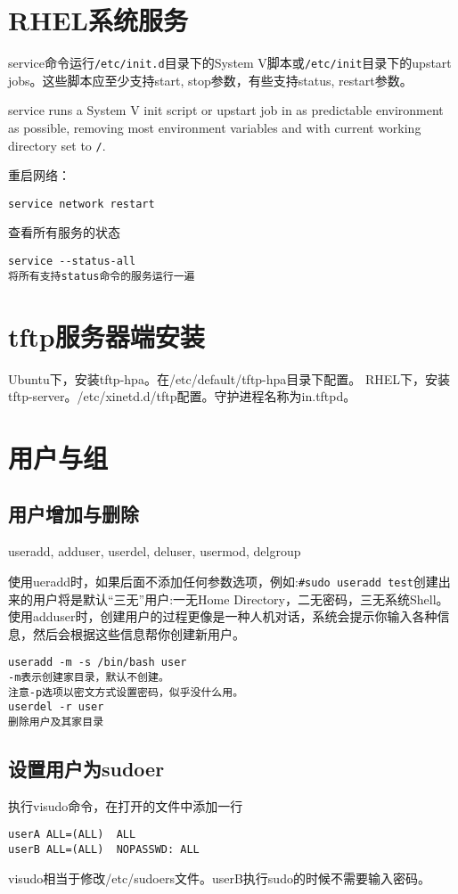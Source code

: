 \section{RHEL系统服务}
service命令运行\verb+/etc/init.d+目录下的System V脚本或\verb+/etc/init+目录下的upstart jobs。这些脚本应至少支持start, stop参数，有些支持status, restart参数。

service runs a System V init script or upstart job in as predictable environment as possible, removing most environment variables and with current working directory set to \verb+/+.  

重启网络：
\begin{verbatim}
service network restart
\end{verbatim}

查看所有服务的状态
\begin{verbatim}
service --status-all
将所有支持status命令的服务运行一遍
\end{verbatim}

\section{tftp服务器端安装}
Ubuntu下，安装tftp-hpa。在/etc/default/tftp-hpa目录下配置。
RHEL下，安装tftp-server。/etc/xinetd.d/tftp配置。守护进程名称为in.tftpd。
\section{用户与组}

\subsection{用户增加与删除}
useradd, adduser, userdel, deluser, usermod, delgroup

使用ueradd时，如果后面不添加任何参数选项，例如:\verb+#sudo useradd test+创建出来的用户将是默认“三无”用户:一无Home Directory，二无密码，三无系统Shell。
使用adduser时，创建用户的过程更像是一种人机对话，系统会提示你输入各种信息，然后会根据这些信息帮你创建新用户。
\begin{verbatim}
useradd -m -s /bin/bash user 
-m表示创建家目录，默认不创建。
注意-p选项以密文方式设置密码，似乎没什么用。
userdel -r user
删除用户及其家目录
\end{verbatim}

\subsection{设置用户为sudoer}
执行visudo命令，在打开的文件中添加一行
\begin{verbatim}
userA ALL=(ALL)  ALL
userB ALL=(ALL)  NOPASSWD: ALL
\end{verbatim}
visudo相当于修改/etc/sudoers文件。userB执行sudo的时候不需要输入密码。

